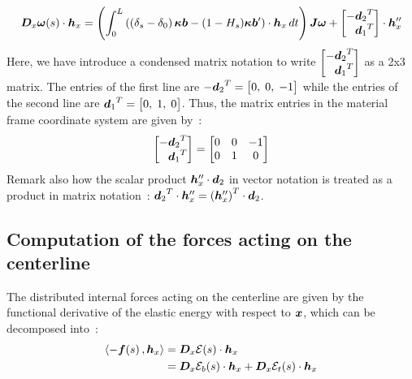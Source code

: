 \begin{equation}
			\pdiffof{x}{\vect{\omega}}{s}{\vect{h}_x}
	= 	\left(\int_0^L \left(\left(\delta_s-\delta_0\right)\vect{\kappa b} - (1-H_s)\vect{\kappa b}'\right)\cdot  \vect{h}_x \,dt\right)\mat{J}\vect{\omega}+
		\begin{bmatrix*}[r]
			-{\vect{d}_2}^T\\
			{\vect{d}_1}^T\\
		\end{bmatrix*}\cdot \vect{h}_x''
\label{eq:dwdx}
\end{equation}
Here, we have introduce a condensed matrix notation to write $\begin{bmatrix*}[r] -{\vect{d}_2}^T\\ {\vect{d}_1}^T\\ \end{bmatrix*}$ as a 2x3 matrix. The entries of the first line are $-{\boldsymbol{d}_2}^T = \begin{bmatrix} 0,\;0,\;-1 \end{bmatrix}$ while the entries of the second line are ${\boldsymbol{d}_1}^T = \begin{bmatrix} 0,\;1,\;0 \end{bmatrix}$. Thus, the matrix entries in the material frame coordinate system are given by~:
\begin{equation}
	\begin{bmatrix*}[r] -{\vect{d}_2}^T\\ {\vect{d}_1}^T \end{bmatrix*}
	= 
	\begin{bmatrix} 0 & 0 & -1 \\ 0 & 1 & 0 \end{bmatrix}
\end{equation}
Remark also how the scalar product $\boldsymbol{h}_x''\cdot\boldsymbol{d}_2$ in vector notation is treated as a product in matrix notation~: ${\boldsymbol{d}_2}^T \cdot \boldsymbol{h}_x'' =  {(\boldsymbol{h}_x'')}^T \cdot {\boldsymbol{d}_2}$.

\subsection{Computation of the forces acting on the centerline}
The distributed internal forces acting on the centerline are given by the functional derivative of the elastic energy with respect to $\boldsymbol{x}$, which can be decomposed into~:
\begin{equation}
	\begin{aligned}
	\langle -\boldsymbol{f}(s)\,, \boldsymbol{h}_x\rangle 
	&= \boldsymbol{D}_x\mathcal{E}(s)\cdot\boldsymbol{h}_x \\
	&= \boldsymbol{D}_x\mathcal{E}_b(s)\cdot\boldsymbol{h}_x + \boldsymbol{D}_x\mathcal{E}_t(s)\cdot\boldsymbol{h}_x \\
	\end{aligned}
\label{eq:dEdx_def}
\end{equation}

